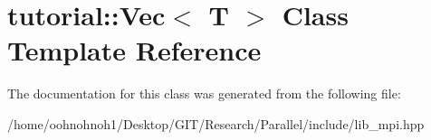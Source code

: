 \hypertarget{classtutorial_1_1Vec}{}\section{tutorial\+:\+:Vec$<$ T $>$ Class Template Reference}
\label{classtutorial_1_1Vec}


The documentation for this class was generated from the following file\+:\begin{DoxyCompactItemize}
\item 
/home/oohnohnoh1/\+Desktop/\+G\+I\+T/\+Research/\+Parallel/include/lib\+\_\+mpi.\+hpp\end{DoxyCompactItemize}
